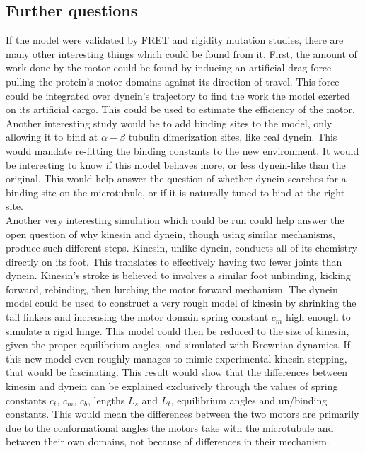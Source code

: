 \documentclass[
11pt, %
english, %
singlespacing, %
headsepline, %
chapterinoneline, %
]{MastersDoctoralThesis} %
\begin{document}

\subsection{Further questions}
If the model were validated by FRET and rigidity mutation studies, there are many other interesting things which could be found from it. First, the amount of work done by the motor could be found by inducing an artificial drag force pulling the protein's motor domains against its direction of travel. This force could be integrated over dynein's trajectory to find the work the model exerted on its artificial cargo. This could be used to estimate the efficiency of the motor. Another interesting study would be to add binding sites to the model, only allowing it to bind at $\alpha-\beta$ tubulin dimerization sites, like real dynein. This would mandate re-fitting the binding constants to the new environment. It would be interesting to know if this model behaves more, or less dynein-like than the original. This would help answer the question of whether dynein searches for a binding site on the microtubule, or if it is naturally tuned to bind at the right site.\\

Another very interesting simulation which could be run could help answer the open question of why kinesin and dynein, though using similar mechanisms, produce such different steps. Kinesin, unlike dynein, conducts all of its chemistry directly on its foot. This translates to effectively having two fewer joints than dynein. Kinesin's stroke is believed to involves a similar foot unbinding, kicking forward, rebinding, then lurching the motor forward mechanism. The dynein model could be used to construct a very rough model of kinesin by shrinking the tail linkers and increasing the motor domain spring constant $c_m$ high enough to simulate a rigid hinge. This model could then be reduced to the size of kinesin, given the proper equilibrium angles, and simulated with Brownian dynamics. If this new model even roughly manages to mimic experimental kinesin stepping, that would be fascinating. This result would show that the differences between kinesin and dynein can be explained exclusively through the values of spring constants $c_t$, $c_m$, $c_b$, lengths $L_s$ and $L_t$, equilibrium angles and un/binding constants. This would mean the differences between the two motors are primarily due to the conformational angles the motors take with the microtubule and between their own domains, not because of differences in their mechanism.\\
\end{document}
